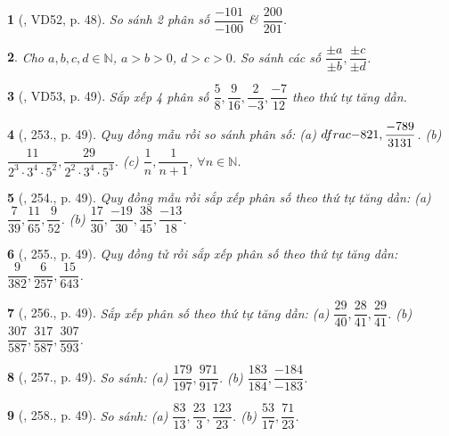 \documentclass{article}
\newtheorem{baitoan}{}
\begin{document}
\begin{baitoan}[\cite{Tuyen_Toan_6}, VD52, p. 48]
	So sánh 2 phân số $\dfrac{-101}{-100}$ \& $\dfrac{200}{201}$.
\end{baitoan}

\begin{baitoan}
	Cho $a,b,c,d\in\mathbb{N}$, $a > b > 0$, $d > c > 0$. So sánh các số $\dfrac{\pm a}{\pm b},\dfrac{\pm c}{\pm d}$.
\end{baitoan}

\begin{baitoan}[\cite{Tuyen_Toan_6}, VD53, p. 49]
	Sắp xếp 4 phân số $\dfrac{5}{8},\dfrac{9}{16},\dfrac{2}{-3},\dfrac{-7}{12}$ theo thứ tự tăng dần.
\end{baitoan}

\begin{baitoan}[\cite{Tuyen_Toan_6}, 253., p. 49]
	Quy đồng mẫu rồi so sánh phân số: (a) $\\dfrac{-8}{21},\dfrac{-789}{3131}$. (b) $\dfrac{11}{2^3\cdot3^4\cdot5^2},\dfrac{29}{2^2\cdot3^4\cdot5^3}$. (c) $\dfrac{1}{n},\dfrac{1}{n + 1}$, $\forall n\in\mathbb{N}$.
\end{baitoan}

\begin{baitoan}[\cite{Tuyen_Toan_6}, 254., p. 49]
	Quy đồng mẫu rồi sắp xếp phân số theo thứ tự tăng dần: (a) $\dfrac{7}{39},\dfrac{11}{65},\dfrac{9}{52}$. (b) $\dfrac{17}{30},\dfrac{-19}{30},\dfrac{38}{45},\dfrac{-13}{18}$.
\end{baitoan}

\begin{baitoan}[\cite{Tuyen_Toan_6}, 255., p. 49]
	Quy đồng tử rồi sắp xếp phân số theo thứ tự tăng dần: $\dfrac{9}{382},\dfrac{6}{257},\dfrac{15}{643}$.
\end{baitoan}

\begin{baitoan}[\cite{Tuyen_Toan_6}, 256., p. 49]
	Sắp xếp phân số theo thứ tự tăng dần: (a) $\dfrac{29}{40},\dfrac{28}{41},\dfrac{29}{41}$. (b) $\dfrac{307}{587},\dfrac{317}{587},\dfrac{307}{593}$.
\end{baitoan}

\begin{baitoan}[\cite{Tuyen_Toan_6}, 257., p. 49]
	So sánh: (a) $\dfrac{179}{197},\dfrac{971}{917}$. (b) $\dfrac{183}{184},\dfrac{-184}{-183}$.
\end{baitoan}

\begin{baitoan}[\cite{Tuyen_Toan_6}, 258., p. 49]
	So sánh: (a) $\dfrac{83}{13},\dfrac{23}{3},\dfrac{123}{23}$. (b) $\dfrac{53}{17},\dfrac{71}{23}$.
\end{baitoan}
\end{document}
